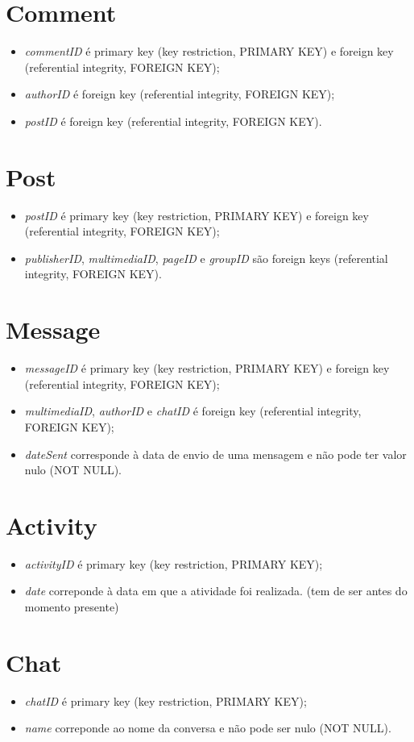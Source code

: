 \documentclass[12pt]{report}
\begin{document}
\section{Comment}

\begin{itemize}
    \item \textit{commentID} é primary key (key restriction, PRIMARY KEY) e foreign key (referential integrity, FOREIGN KEY);
    \item \textit{authorID} é foreign key (referential integrity, FOREIGN KEY);
    \item \textit{postID} é foreign key (referential integrity, FOREIGN KEY).
\end{itemize}

\section{Post}

\begin{itemize}
    \item \textit{postID} é primary key (key restriction, PRIMARY KEY) e foreign key (referential integrity, FOREIGN KEY);
    \item \textit{publisherID}, \textit{multimediaID}, \textit{pageID} e \textit{groupID} são foreign keys (referential integrity, FOREIGN KEY).
\end{itemize}
    
\section{Message}

\begin{itemize}
    \item \textit{messageID} é primary key (key restriction, PRIMARY KEY) e foreign key (referential integrity, FOREIGN KEY);
    \item \textit{multimediaID}, \textit{authorID} e \textit{chatID} é foreign key (referential integrity, FOREIGN KEY);
    \item \textit{dateSent} corresponde à data de envio de uma mensagem e não pode ter valor nulo (NOT NULL).
\end{itemize}

\section{Activity}

\begin{itemize}
    \item \textit{activityID} é primary key (key restriction, PRIMARY KEY);
    \item \textit{date} correponde à data em que a atividade foi realizada. (tem de ser antes do momento presente)
\end{itemize}

\section{Chat}

\begin{itemize}
    \item \textit{chatID} é primary key (key restriction, PRIMARY KEY);
    \item \textit{name} correponde ao nome da conversa e não pode ser nulo (NOT NULL).
\end{itemize}
\end{document}

